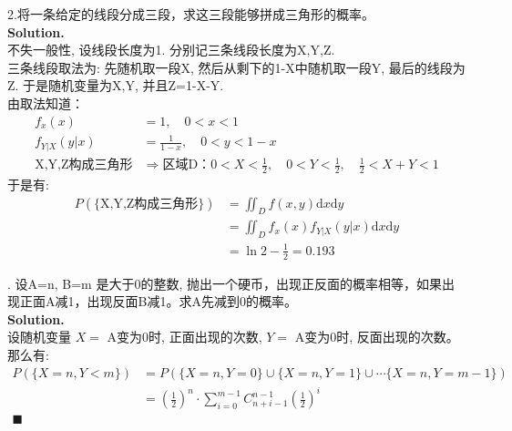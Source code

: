 \documentclass[UTF8]{article}
\begin{document}
\noindent 2.将一条给定的线段分成三段，求这三段能够拼成三角形的概率。 \\
\noindent \textbf{Solution.} \\
不失一般性, 设线段长度为1. 分别记三条线段长度为X,Y,Z. \\
三条线段取法为: 先随机取一段X, 然后从剩下的1-X中随机取一段Y, 最后的线段为Z. 于是随机变量为X,Y, 并且Z=1-X-Y. \\
由取法知道：
\begin{align*}
f_x(x) & = 1, \quad 0<x<1 \\
f_{Y|X}(y|x) & = \frac{1}{1-x}, \quad 0<y<1-x \\
\text{X,Y,Z构成三角形} & \Longrightarrow \text{区域D：}0<X<\frac{1}{2}, \quad 0<Y<\frac{1}{2},\quad \frac{1}{2}<X+Y<1
\end{align*}
于是有: 
\begin{align*}
P(\{\text{X,Y,Z构成三角形}\}) & = \iint_{D} f(x,y)\mathrm{d}x\mathrm{d}y  \\
 & = \iint_{D} f_x(x) f_{Y|X}(y|x) \mathrm{d}x\mathrm{d}y \\
 & = \ln2 - \frac{1}{2}= 0.193
\end{align*}

. 设A=n, B=m 是大于0的整数, 抛出一个硬币，出现正反面的概率相等，如果出现正面A减1，出现反面B减1。求A先减到0的概率。 \\
\noindent \textbf{Solution.} \\
设随机变量 $X=$ A变为0时, 正面出现的次数, $Y=$ A变为0时, 反面出现的次数。 那么有: \\
\begin{align*}
P(\{ X=n, Y<m \})  &= P(\{ X=n, Y=0 \} \cup \{ X=n, Y=1 \} \cup \cdots \{ X=n, Y=m-1 \} )   \\
&= (\frac{1}{2})^n \cdot \sum_{i=0}^{m-1} C_{n+i-1}^{n-1} (\frac{1}{2})^i  \\
\blacksquare 
\end{align*}
\end{document}
